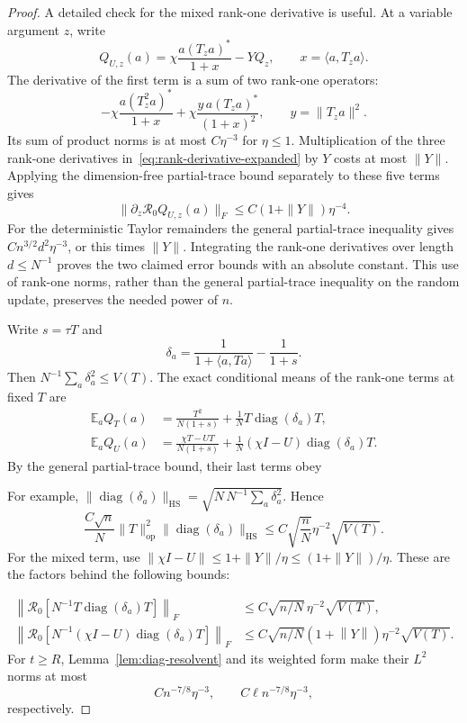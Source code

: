 \documentclass[10pt,a4paper]{amsart}
\newcommand{\E}{\mathbb E}
\newcommand{\HS}{\mathrm{HS}}
\newcommand{\R}{\mathcal R}
\newcommand{\ip}[2]{\langle#1,#2\rangle}
\newcommand{\norm}[1]{\left\lVert#1\right\rVert}
\newcommand{\op}{\mathrm{op}}
\begin{document}
\begin{proof}
A detailed check for the mixed rank-one derivative is useful. At a variable argument $z$, write
\[
 Q_{U,z}(a)=\chi\frac{a(T_za)^*}{1+x}-YQ_z,
 \qquad x=\langle a,T_za\rangle.
\]
The derivative of the first term is a sum of two rank-one operators:
\[
 -\chi\frac{a(T_z^2a)^*}{1+x}
 +\chi\frac{y\,a(T_za)^*}{(1+x)^2},\qquad y=\|T_za\|^2.
\]
Its sum of product norms is at most $C\eta^{-3}$ for $\eta\le1$. Multiplication of the three rank-one derivatives in~\eqref{eq:rank-derivative-expanded} by $Y$ costs at most $\|Y\|$. Applying the dimension-free partial-trace bound separately to these five terms gives
\[
 \|\partial_z\R_0Q_{U,z}(a)\|_F
 \le C(1+\|Y\|)\eta^{-4}.
\]
For the deterministic Taylor remainders the general partial-trace inequality gives
$Cn^{3/2}d^2\eta^{-3}$, or this times $\|Y\|$. Integrating the rank-one derivatives over length $d\le N^{-1}$ proves the two claimed error bounds with an absolute constant. This use of rank-one norms, rather than the general partial-trace inequality on the random update, preserves the needed power of $n$.


Write $s=\tau T$ and
\[
 \delta_a=\frac1{1+\ip a{Ta}}-\frac1{1+s}.
\]
Then $N^{-1}\sum_a\delta_a^2\le V(T)$. The exact conditional means of the rank-one terms at fixed $T$ are
\begin{align}
 \E_aQ_T(a)&=\frac{T^2}{N(1+s)}+
                \frac1N T\operatorname{diag}(\delta_a)T,
                \label{eq:Tmean}\\
 \E_aQ_U(a)&=\frac{\chi T-UT}{N(1+s)}+
                \frac1N(\chi I-U)\operatorname{diag}(\delta_a)T.
                \label{eq:Umean}
\end{align}
By the general partial-trace bound, their last terms obey

For example, $\|\operatorname{diag}(\delta_a)\|_{\HS}=\sqrt{N\,N^{-1}\sum_a\delta_a^2}$. Hence
\[
 \frac{C\sqrt n}{N}\|T\|_{\op}^2
       \|\operatorname{diag}(\delta_a)\|_{\HS}
 \le C\sqrt{\frac nN}\eta^{-2}\sqrt{V(T)}.
\]
For the mixed term, use $\|\chi I-U\|\le1+\|Y\|/\eta\le(1+\|Y\|)/\eta$. These are the factors behind the following bounds:

\begin{align}
 \left\|\R_0\left[N^{-1}T\operatorname{diag}(\delta_a)T\right]\right\|_F
 &\le C\sqrt{n/N}\,\eta^{-2}\sqrt{V(T)},\label{eq:den-T}\\
 \left\|\R_0\left[N^{-1}(\chi I-U)\operatorname{diag}(\delta_a)T\right]\right\|_F
 &\le C\sqrt{n/N}(1+\norm Y)\eta^{-2}\sqrt{V(T)}.
 \label{eq:den-U}
\end{align}
For $t\ge R$, Lemma~\ref{lem:diag-resolvent} and its weighted form make their $L^2$ norms at most
\begin{equation}\label{eq:den-L2}
 Cn^{-7/8}\eta^{-3},\qquad C\ell n^{-7/8}\eta^{-3},
\end{equation}
respectively.


\end{proof}
\end{document}
